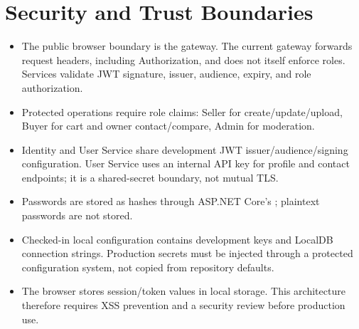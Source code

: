 \documentclass[11pt,a4paper]{article}
\newcommand{\code}[1]{\texttt{\detokenize{#1}}}
\begin{document}
\section{Security and Trust Boundaries}
\begin{itemize}
  \item The public browser boundary is the gateway. The current gateway forwards
  request headers, including Authorization, and does not itself enforce roles.
  Services validate JWT signature, issuer, audience, expiry, and role authorization.
  \item Protected operations require role claims: Seller for create/update/upload,
  Buyer for cart and owner contact/compare, Admin for moderation.
  \item Identity and User Service share development JWT issuer/audience/signing
  configuration. User Service uses an internal API key for profile and contact
  endpoints; it is a shared-secret boundary, not mutual TLS.
  \item Passwords are stored as hashes through ASP.NET Core's
  \code{PasswordHasher<T>}; plaintext passwords are not stored.
  \item Checked-in local configuration contains development keys and LocalDB
  connection strings. Production secrets must be injected through a protected
  configuration system, not copied from repository defaults.
  \item The browser stores session/token values in local storage. This architecture
  therefore requires XSS prevention and a security review before production use.
\end{itemize}
\end{document}
